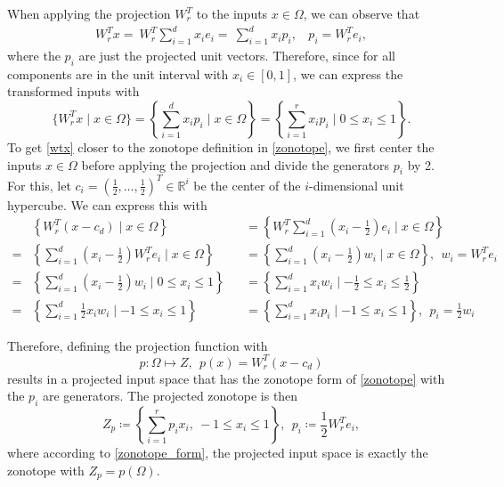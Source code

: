 \documentclass[
  a4paper,  %
  twoside,  %
  bibliography=totoc,
  headsepline,
  cleardoublepage=empty,
  parskip=half,
  draft=false
]{scrbook}
\begin{document}
When applying the projection $W_r^T$ to the inputs $x \in \Omega$, we can observe that
\begin{equation}
\begin{split}
W_r^T x=~W_r^T \sum_{i=1}^d x_i e_i=~\sum_{i=1}^d x_i p_i , ~~~~ p_i=W_r^T e_i,
\nonumber
\end{split}
\end{equation}
where the $p_i$ are just the projected unit vectors.
Therefore, since for all components are in the unit interval with $x_i \in [0,1]$, we can express the transformed inputs with
\begin{equation}
\{W_r^T x \mid x \in \Omega\}=\left\{\sum_{i=1}^d x_i p_i \mid x \in \Omega \right\}=\left\{ \sum_{i=1}^r x_i p_i \mid 0 \leq x_i \leq 1\right\}.
\label{wtx}
\end{equation}
To get \cref{wtx} closer to the zonotope definition in \cref{zonotope}, we first center the inputs $x \in \Omega$ before applying the projection and divide the generators $p_i$ by 2.
For this, let $c_i=(\frac{1}{2}, \dots, \frac{1}{2})^T\in \mathbb{R}^i$ be the center of the $i$-dimensional unit hypercube.
We can express this with
\begin{equation}
\begin{alignedat}{2}
&\left\{W_r^T (x - c_d) \mid x \in \Omega\right\}&&=\left\{W_r^T \sum_{i=1}^d \left(x_i - \frac{1}{2}\right) e_i \mid x \in \Omega \right\}\\
=&\left\{\sum_{i=1}^d \left(x_i - \frac{1}{2}\right) W_r^T e_i \mid x \in \Omega \right\}&&=\left\{\sum_{i=1}^d \left(x_i - \frac{1}{2}\right) w_i \mid x \in \Omega \right\}, ~~ w_i=W_r^T e_i\\
=&\left\{\sum_{i=1}^d \left(x_i - \frac{1}{2}\right) w_i \mid 0 \leq x_i \leq 1 \right\}&&=\left\{\sum_{i=1}^d x_i w_i \mid -\frac{1}{2} \leq x_i \leq \frac{1}{2} \right\}\\
=&\left\{\sum_{i=1}^d \frac{1}{2} x_i w_i \mid -1 \leq x_i \leq 1 \right\}&&=\left\{\sum_{i=1}^d x_i p_i \mid -1 \leq x_i \leq 1 \right\}, ~~ p_i=\frac{1}{2} w_i
\label{zonotope_form}
\end{alignedat}
\end{equation}

Therefore, defining the projection function with
\begin{equation}
p \colon \Omega \mapsto Z, ~~ p(x)=W_r^T (x-c_d)
\nonumber
\end{equation}
results in a projected input space that has the zonotope form of \cref{zonotope} with the $p_i$ are generators.
The projected zonotope is then
\begin{equation}
Z_{p} \coloneqq \left\{\sum_{i=1}^r p_i x_i , ~ -1 \leq x_i \leq 1\right\}, ~~ p_i \coloneqq \frac{1}{2} W_r^T e_i,
\nonumber
\end{equation}
where according to \cref{zonotope_form}, the projected input space is exactly the zonotope with $Z_{p}=p(\Omega)$.
\end{document}
